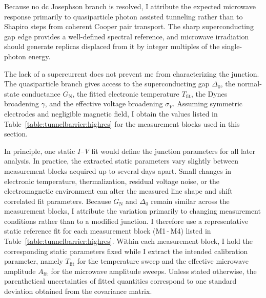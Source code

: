     Because no dc Josephson branch is resolved, I attribute the expected microwave response primarily to quasiparticle photon assisted tunneling rather than to Shapiro steps from coherent Cooper pair transport. The sharp superconducting gap edge provides a well-defined spectral reference, and microwave irradiation should generate replicas displaced from it by integer multiples of the single-photon energy.

    The lack of a supercurrent does not prevent me from characterizing the junction. The quasiparticle branch gives access to the superconducting gap $\Delta_0$, the normal-state conductance $G_\mathrm{N}$, the fitted electronic temperature $T_\mathrm{fit}$, the Dynes broadening $\gamma$, and the effective voltage broadening $\sigma_V$. Assuming symmetric electrodes and negligible magnetic field, I obtain the values listed in Table~\ref{table:tunnelbarrier:highres} for the measurement blocks used in this section.

    In principle, one static \textit{I--V} fit would define the junction parameters for all later analysis. In practice, the extracted static parameters vary slightly between measurement blocks acquired up to several days apart. Small changes in electronic temperature, thermalization, residual voltage noise, or the electromagnetic environment can alter the measured line shape and shift correlated fit parameters. Because $G_\mathrm{N}$ and $\Delta_0$ remain similar across the measurement blocks, I attribute the variation primarily to changing measurement conditions rather than to a modified junction. I therefore use a representative static reference fit for each measurement block (M1\,-\,M4) listed in Table~\ref{table:tunnelbarrier:highres}. Within each measurement block, I hold the corresponding static parameters fixed while I extract the intended calibration parameter, namely $T_\mathrm{fit}$ for the temperature sweep and the effective microwave amplitude $A_\mathrm{fit}$ for the microwave amplitude sweeps. Unless stated otherwise, the parenthetical uncertainties of fitted quantities correspond to one standard deviation obtained from the covariance matrix.

